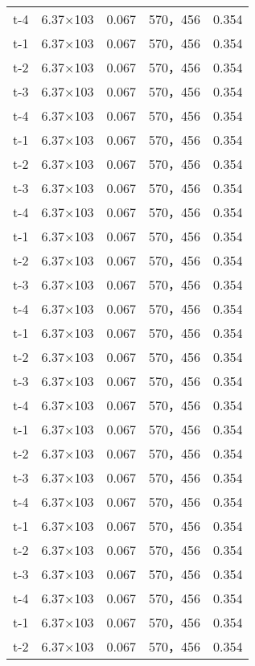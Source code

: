 \begin{longtable}{ccccc}
t-4     &6.37×103       &0.067  &570，456        &0.354\\
t-1     &6.37×103       &0.067  &570，456        &0.354\\
t-2     &6.37×103       &0.067  &570，456        &0.354\\
t-3     &6.37×103       &0.067  &570，456        &0.354\\
t-4     &6.37×103       &0.067  &570，456        &0.354\\
t-1     &6.37×103       &0.067  &570，456        &0.354\\
t-2     &6.37×103       &0.067  &570，456        &0.354\\
t-3     &6.37×103       &0.067  &570，456        &0.354\\
t-4     &6.37×103       &0.067  &570，456        &0.354\\
t-1     &6.37×103       &0.067  &570，456        &0.354\\
t-2     &6.37×103       &0.067  &570，456        &0.354\\
t-3     &6.37×103       &0.067  &570，456        &0.354\\
t-4     &6.37×103       &0.067  &570，456        &0.354\\
t-1     &6.37×103       &0.067  &570，456        &0.354\\
t-2     &6.37×103       &0.067  &570，456        &0.354\\
t-3     &6.37×103       &0.067  &570，456        &0.354\\
t-4     &6.37×103       &0.067  &570，456        &0.354\\
t-1     &6.37×103       &0.067  &570，456        &0.354\\
t-2     &6.37×103       &0.067  &570，456        &0.354\\
t-3     &6.37×103       &0.067  &570，456        &0.354\\
t-4     &6.37×103       &0.067  &570，456        &0.354\\
t-1     &6.37×103       &0.067  &570，456        &0.354\\
t-2     &6.37×103       &0.067  &570，456        &0.354\\
t-3     &6.37×103       &0.067  &570，456        &0.354\\
t-4     &6.37×103       &0.067  &570，456        &0.354\\
t-1     &6.37×103       &0.067  &570，456        &0.354\\
t-2     &6.37×103       &0.067  &570，456        &0.354\\

\end{longtable}
